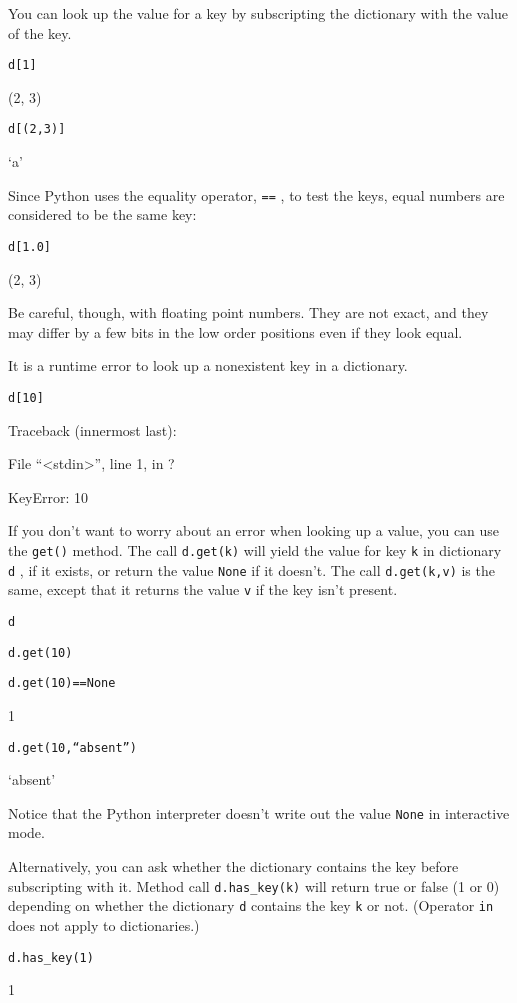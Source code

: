 You can look up the value for a key
by subscripting the dictionary with the value of the key.


\texttt{d{[}1{]}}

(2, 3)


\texttt{d{[}(2,3){]}}

`a'

Since Python uses the equality
operator, \texttt{==} , to test the keys, equal numbers are considered to
be the same key:


\texttt{d{[}1.0{]}}

(2, 3)

Be careful, though, with floating
point numbers. They are not exact, and they may differ by a few bits in
the low order positions even if they look equal.

It is a runtime error to look up a
nonexistent key in a dictionary.


\texttt{d{[}10{]}}

Traceback (innermost last):

 File
``\textless{}stdin\textgreater{}'', line 1, in ?

KeyError: 10

If you don't want to worry about an
error when looking up a value, you can use the \texttt{get()} method. The
call \texttt{d.get(k)} will yield the value for key \texttt{k} in dictionary
\texttt{d} , if it exists, or return the value \texttt{None} if it doesn't.
The call \texttt{d.get(k,v)} is the same, except that it returns the value
\texttt{v} if the key isn't present.


\texttt{d}




\texttt{d.get(10)}


\texttt{d.get(10)==None}

1


\texttt{d.get(10,``absent'')}

`absent'

Notice that the Python interpreter
doesn't write out the value \texttt{None} in interactive mode.

Alternatively, you can ask whether
the dictionary contains the key before subscripting with it. Method call
\texttt{d.has\_key(k)} will return true or false (1 or 0) depending on
whether the dictionary \texttt{d} contains the key \texttt{k} or not.
(Operator \texttt{in} does not apply to dictionaries.)


\texttt{d.has\_key(1)}

1


